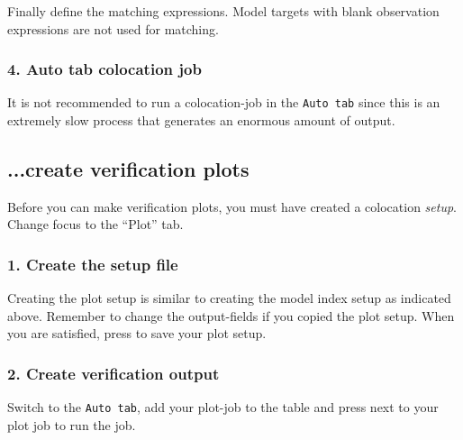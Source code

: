 \documentclass[letterpaper,10pt,twoside,twocolumn,openany]{book}
\begin{document}
{Finally define the matching expressions.
Model targets with blank observation expressions are not used for matching.

\subsubsection{4. Auto tab colocation job}
It is not recommended to run a colocation-job in the \lstinline!Auto tab! since this 
is an extremely slow process that generates an enormous amount of output.

\subsection{...create verification plots}
Before you can make verification plots, you must have
created a colocation {\em setup}.
Change focus to the ``Plot'' tab.

\subsubsection{1. Create the setup file} 
Creating the plot setup is similar to creating the model index setup as indicated above. 
Remember to change the output-fields if you copied the plot setup.
When you are satisfied, press  to save your plot setup.

\subsubsection{2. Create verification output} 
Switch to the \lstinline!Auto tab!, add your plot-job to the table and 
press  next to your plot job
to run the job.

}
\end{document}
